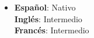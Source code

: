 \begin{itemize}[leftmargin=0.15in, label={}]
    \item{
        \textbf{Español}{: Nativo} \\
        \textbf{Inglés}{: Intermedio} \\
        \textbf{Francés}{: Intermedio}
    }
\end{itemize}
